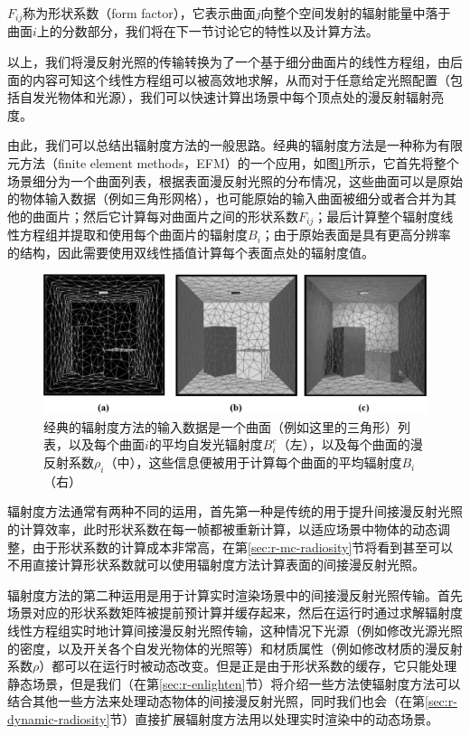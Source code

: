 $F_{ij}$称为形状系数（form factor），它表示曲面$j$向整个空间发射的辐射能量中落于曲面$i$上的分数部分，我们将在下一节讨论它的特性以及计算方法。

以上，我们将漫反射光照的传输转换为了一个基于细分曲面片的线性方程组，由后面的内容可知这个线性方程组可以被高效地求解，从而对于任意给定光照配置（包括自发光物体和光源），我们可以快速计算出场景中每个顶点处的漫反射辐射亮度。

由此，我们可以总结出辐射度方法的一般思路。经典的辐射度方法是一种称为有限元方法（finite element methods，EFM）的一个应用，如图\ref{f:r-radiosity-system-of-equations}所示，它首先将整个场景细分为一个曲面列表，根据表面漫反射光照的分布情况，这些曲面可以是原始的物体输入数据（例如三角形网格），也可能原始的输入曲面被细分或者合并为其他的曲面片；然后它计算每对曲面片之间的形状系数$F_{ij}$；最后计算整个辐射度线性方程组并提取和使用每个曲面片的辐射度$B_i$；由于原始表面是具有更高分辨率的结构，因此需要使用双线性插值计算每个表面点处的辐射度值。

\begin{figure}
	\includegraphics[width=1.\textwidth]{graphics/gi/path-19}
	\caption{经典的辐射度方法的输入数据是一个曲面（例如这里的三角形）列表，以及每个曲面$i$的平均自发光辐射度$B_{i}^{e}$（左），以及每个曲面的漫反射系数$\rho_i$（中），这些信息便被用于计算每个曲面的平均辐射度$B_i$（右）}
	\label{f:r-radiosity-system-of-equations}
\end{figure}

辐射度方法通常有两种不同的运用，首先第一种是传统的用于提升间接漫反射光照的计算效率，此时形状系数在每一帧都被重新计算，以适应场景中物体的动态调整，由于形状系数的计算成本非常高，在第\ref{sec:r-mc-radiosity}节将看到甚至可以不用直接计算形状系数就可以使用辐射度方法计算表面的间接漫反射光照。

辐射度方法的第二种运用是用于计算实时渲染场景中的间接漫反射光照传输。首先场景对应的形状系数矩阵被提前预计算并缓存起来，然后在运行时通过求解辐射度线性方程组实时地计算间接漫反射光照传输，这种情况下光源（例如修改光源光照的密度，以及开关各个自发光物体的光照等）和材质属性（例如修改材质的漫反射系数$\rho$）都可以在运行时被动态改变。但是正是由于形状系数的缓存，它只能处理静态场景，但是我们（在第\ref{sec:r-enlighten}节）将介绍一些方法使辐射度方法可以结合其他一些方法来处理动态物体的间接漫反射光照，同时我们也会（在第\ref{sec:r-dynamic-radiosity}节）直接扩展辐射度方法用以处理实时渲染中的动态场景。

